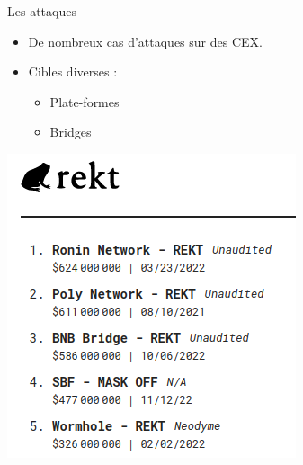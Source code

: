 \begin{frame}{Les attaques}
    \begin{itemize}
        \item De nombreux cas d'attaques sur des CEX.
        \item Cibles diverses :
             \begin{itemize}
            \item Plate-formes
            \item Bridges
        \end{itemize}
    \end{itemize}
    \centering
    \includegraphics[scale = 0.45]{centralisation/img_attaques/rekt.png}
\end{frame}